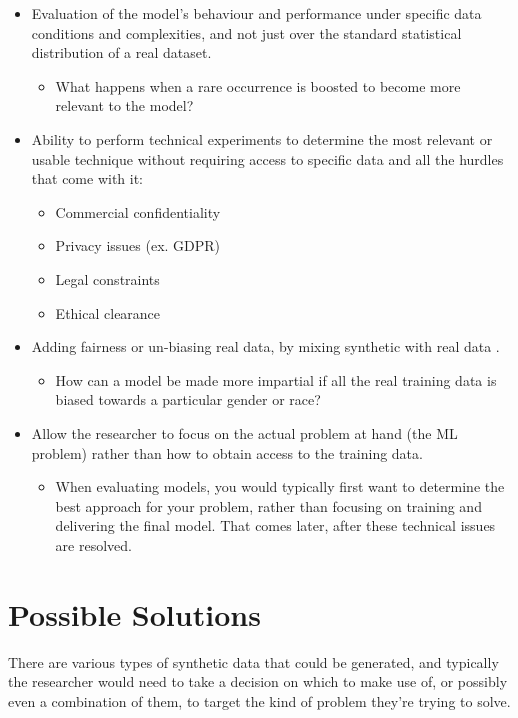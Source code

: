 \begin{itemize}
    \item Evaluation of the model’s behaviour and performance under specific data conditions and complexities, and not just over the standard statistical distribution of a real dataset.
    \begin{itemize}
        \item What happens when a rare occurrence is boosted to become more relevant to the model?
    \end{itemize}
    \item Ability to perform technical experiments to determine the most relevant or usable technique without requiring access to specific data and all the hurdles that come with it:
    \begin{itemize}
        \item Commercial confidentiality
        \item Privacy issues (ex. GDPR)
        \item Legal constraints
        \item Ethical clearance
    \end{itemize}
    \item Adding fairness or un-biasing real data, by mixing synthetic with real data \citep{pedreschi2008,zafar2015}.
    \begin{itemize}
        \item How can a model be made more impartial if all the real training data is biased towards a particular gender or race?
    \end{itemize}
    \item Allow the researcher to focus on the actual problem at hand (the ML problem) rather than how to obtain access to the training data.
    \begin{itemize}
        \item When evaluating models, you would typically first want to determine the best approach for your problem, rather than focusing on training and delivering the final model. That comes later, after these technical issues are resolved.
    \end{itemize}
\end{itemize}

\section{Possible Solutions}

There are various types of synthetic data that could be generated, and typically the researcher would need to take a decision on which to make use of, or possibly even a combination of them, to target the kind of problem they’re trying to solve.

